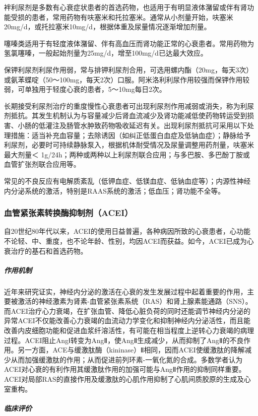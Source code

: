 袢利尿剂是多数有心衰症状患者的首选药物，也适用于有明显液体潴留或伴有肾功能受损的患者，常用药物有呋塞米和托拉塞米。通常从小剂量开始，呋塞米20mg/d，或托拉塞米10mg/d，根据体重及尿量情况逐渐增加剂量。

噻嗪类适用于有轻度液体潴留、伴有高血压而肾功能正常的心衰患者。常用药物为氢氯噻嗪，一般起始剂量为25mg/d，增至100mg/d已达最大效应。

保钾利尿剂利尿作用弱，常与排钾利尿剂合用，可选用螺内酯（20mg，每天3次）或氨苯蝶啶（50～100mg，每天2次）口服。阿米洛利利尿作用较强而保钾作用较弱，可单独用于轻度心衰的患者，5～10mg每日2次。

长期接受利尿剂治疗的重度慢性心衰患者可出现利尿剂作用减弱或消失，称为利尿剂抵抗。其发生机制认为与容量减少后肾血流减少及肾功能减低使药物转运受到损害、小肠的低灌注及肠管水肿致药物吸收延迟有关。出现利尿剂抵抗可采用以下处理措施：适当补充血容量；去除诱因（如纠正低蛋白血症及低钠血症）；静脉给予利尿剂，必要时可持续静脉泵入，根据机体耐受情况及尿量调整用药剂量，呋塞米最大剂量＜
1g/24h；两种或两种以上利尿剂联合应用；与多巴胺、多巴酚丁胺或血管扩张剂联合应用等。

常见的不良反应有电解质紊乱（低钾血症、低镁血症、低钠血症等）；内源性神经内分泌系统的激活，特别是RAAS系统的激活；低血压；肾功能不全等。

\subsubsection{血管紧张素转换酶抑制剂（ACEI）}

自20世纪80年代以来，ACEI的使用日益普遍，各种病因所致的心衰患者，心功能不论轻、中、重度，也不论年龄、性别，均因ACEI而获益。如今，ACEI已成为心衰治疗的基石和首选药物。

\subparagraph{作用机制}

近年来研究证实，神经内分泌的激活在心衰的发生发展过程中起着重要的作用，主要被激活的神经激素为肾素-血管紧张素系统（RAS）和肾上腺素能通路（SNS）。而ACEI治疗心力衰竭，在扩张血管、降低心脏负荷的同时还能调节神经内分泌的异常ACEI不仅能改善心力衰竭的血流动力学变化和抑制神经内分泌活性，而且能改善内皮细胞功能和促进血浆纤溶活性，有可能在相当程度上逆转心力衰竭的病理过程。ACEI阻止AngⅠ转变为AngⅡ，使AngⅡ生成减少，从而抑制了AngⅡ的不良作用。另一方面，ACE与缓激肽酶（kininase）Ⅱ相同，因而ACEI使缓激肽的降解减少从而加强缓激肽的作用；从而促进前列环素-一氧化氮的合成。多数学者认为ACEI对心衰的有利作用其缓激肽作用的加强可能与AngⅡ作用的抑制同样重要。ACEI对局部RAS的直接作用及缓激肽的心肌作用抑制了心肌间质胶原的生成及心室重构。

\subparagraph{临床评价}

